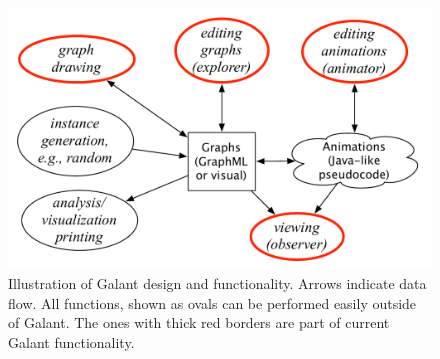 \begin{figure}[p]

\centering

\includegraphics[width=\columnwidth]{X_overview_diagram}

\caption{Illustration of Galant design and functionality. Arrows indicate
  data flow. All functions, shown as ovals can be performed easily outside of
Galant. The ones with thick red borders are part of current Galant
functionality.}

\label{fig:overview_diagram}
\end{figure}

